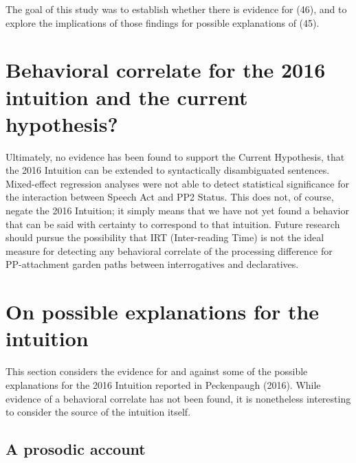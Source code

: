 \documentclass[11pt,oneside]{book}
\begin{document}
The goal of this study was to establish whether there is evidence for (46), and to explore the implications of those findings for possible explanations of (45).

\hypertarget{behavioral-correlate-for-the-2016-intuition-and-the-current-hypothesis}{%
\section{Behavioral correlate for the 2016 intuition and the current hypothesis?}\label{behavioral-correlate-for-the-2016-intuition-and-the-current-hypothesis}}

Ultimately, no evidence has been found to support the Current Hypothesis, that the 2016 Intuition can be extended to syntactically disambiguated sentences. Mixed-effect regression analyses were not able to detect statistical significance for the interaction between Speech Act and PP2 Status. This does not, of course, negate the 2016 Intuition; it simply means that we have not yet found a behavior that can be said with certainty to correspond to that intuition. Future research should pursue the possibility that IRT (Inter-reading Time) is not the ideal measure for detecting any behavioral correlate of the processing difference for PP-attachment garden paths between interrogatives and declaratives.

\hypertarget{on-possible-explanations-for-the-intuition}{%
\section{On possible explanations for the intuition}\label{on-possible-explanations-for-the-intuition}}

This section considers the evidence for and against some of the possible explanations for the 2016 Intuition reported in Peckenpaugh (2016). While evidence of a behavioral correlate has not been found, it is nonetheless interesting to consider the source of the intuition itself.

\hypertarget{prep}{%
\subsection{A prosodic account}\label{prep}}
\end{document}
